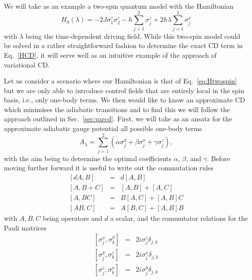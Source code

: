 \iffalse
We will take as an example a two-spin quantum model with the Hamiltonian
\begin{equation}\label{eq:Htwospin}
    H_0(\lambda) = -2J \sigma_1^z \sigma_2^z - h \sum_{j=1}^{2} \sigma_j^z + 2h\lambda \sum_{j=1}^{2} \sigma_j^x 
\end{equation}
with $\lambda$ being the time-dependent driving field. While this two-spin model could be solved in a rather straightforward fashion to determine the exact CD term in Eq.~\eqref{HCD}, it will serve well as an intuitive example of the approach of variational CD.

Let us consider a scenario where our Hamiltonian is that of Eq.~\eqref{eq:Htwospin} but we are only able to introduce control fields that are entirely local in the spin basis, i.e., only one-body terms. We then would like to know an approximate CD which minimises the adiabatic transitions and to find this we will follow the approach outlined in Sec.~\ref{sec:varcd}. First, we will take as an ansatz for the approximate adiabatic gauge potential all possible one-body terms
\begin{equation}
    A_\lambda = \sum_{j=1}^{2} \left( \alpha \sigma_j^y + \beta \sigma_j^x + \gamma \sigma_j^z \right),
\end{equation}
with the aim being to determine the optimal coefficients $\alpha$, $\beta$, and $\gamma$. Before moving further forward it is useful to write out the commutation rules 
\begin{eqnarray}
    \left[d A, B \right] & = & d \left[A, B \right] \nonumber\\
    \left[A, B + C\right] & = & \left[A, B \right] + \left[A, C\right] \nonumber\\
    \left[ A, BC \right] & = & B \left[ A, C \right] +  \left[ A, B \right] C \nonumber\\
    \left[ AB, C \right] & = & A \left[ B, C \right] +  \left[ A, B \right] B \nonumber
\end{eqnarray}
with $A,B,C$ being operators and $d$ a scalar, and the commutator relations for the Pauli matrices
\begin{eqnarray}
    \left[ \sigma_j^x, \sigma_k^y \right] & = & 2 i \sigma_j^z \delta_{j,k} \nonumber \\
    \left[ \sigma_j^y, \sigma_k^z \right] & = & 2 i \sigma_j^x \delta_{j,k}  \nonumber \\
    \left[ \sigma_j^z, \sigma_k^x \right] & = & 2 i \sigma_j^y \delta_{j,k} \nonumber
\end{eqnarray}
